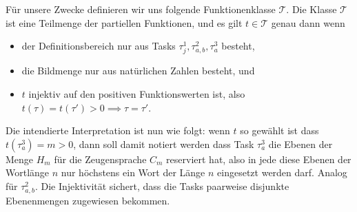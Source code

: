 Für unsere Zwecke definieren wir uns folgende Funktionenklasse $\mathcal T$. Die Klasse $\mathcal T$ ist eine Teilmenge der partiellen Funktionen, und es gilt $t\in\mathcal T$ genau dann wenn 
\begin{itemize}[nosep]
    \item der Definitionsbereich nur aus Tasks $\tau^1_j, \tau^2_{a,b}, \tau^3_a$ besteht, 
    \item die Bildmenge nur aus natürlichen Zahlen besteht, und
    \item $t$ injektiv auf den positiven Funktionswerten ist, also $t(\tau)=t(\tau')>0 \implies \tau=\tau'$.
\end{itemize}
Die intendierte Interpretation ist nun wie folgt: wenn $t$ so gewählt ist dass $t(\tau^3_a)=m>0$, dann soll damit notiert werden dass Task $\tau^3_a$ die Ebenen der Menge $H_m$ für die Zeugensprache $C_m$ reserviert hat, also in jede diese Ebenen der Wortlänge $n$ nur höchstens ein Wort der Länge $n$ eingesetzt werden darf. Analog für $\tau^2_{a,b}$.
Die Injektivität sichert, dass die Tasks paarweise disjunkte Ebenenmengen zugewiesen bekommen.

